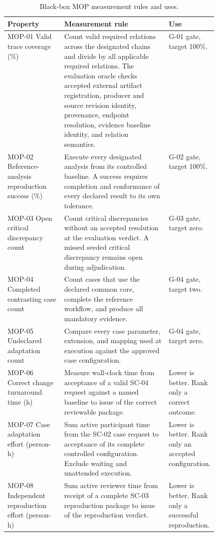 \documentclass[11pt,a4paper]{article}
\begin{document}
\begin{table}[H]
    \centering
    \scriptsize
    \caption{Black-box MOP measurement rules and uses.}
    \label{tab:framework-mop-protocols}
    \begin{tabularx}{\linewidth}{>{\raggedright\arraybackslash}p{0.27\linewidth} X >{\raggedright\arraybackslash}p{0.22\linewidth}}
        \toprule
        \textbf{Property} & \textbf{Measurement rule} & \textbf{Use} \\
        \midrule
        MOP-01 Valid trace coverage (\%) & Count valid required relations across the designated chains and divide by all applicable required relations. The evaluation oracle checks accepted external artifact registration, producer and source revision identity, provenance, endpoint resolution, evidence baseline identity, and relation semantics. & G-01 gate, target 100\%. \\
        MOP-02 Reference-analysis reproduction success (\%) & Execute every designated analysis from its controlled baseline. A success requires completion and conformance of every declared result to its own tolerance. & G-02 gate, target 100\%. \\
        MOP-03 Open critical discrepancy count & Count critical discrepancies without an accepted resolution at the evaluation verdict. A missed seeded critical discrepancy remains open during adjudication. & G-03 gate, target zero. \\
        MOP-04 Completed contrasting case count & Count cases that use the declared common core, complete the reference workflow, and produce all mandatory evidence. & G-04 gate, target two. \\
        MOP-05 Undeclared adaptation count & Compare every case parameter, extension, and mapping used at execution against the approved case configuration. & G-04 gate, target zero. \\
        MOP-06 Correct change turnaround time (h) & Measure wall-clock time from acceptance of a valid SC-04 request against a named baseline to issue of the correct reviewable package. & Lower is better. Rank only a correct outcome. \\
        MOP-07 Case adaptation effort (person-h) & Sum active participant time from the SC-02 case request to acceptance of its complete controlled configuration. Exclude waiting and unattended execution. & Lower is better. Rank only an accepted configuration. \\
        MOP-08 Independent reproduction effort (person-h) & Sum active reviewer time from receipt of a complete SC-03 reproduction package to issue of the reproduction verdict. & Lower is better. Rank only a successful reproduction. \\

\end{tabularx}
\end{table}
\end{document}
